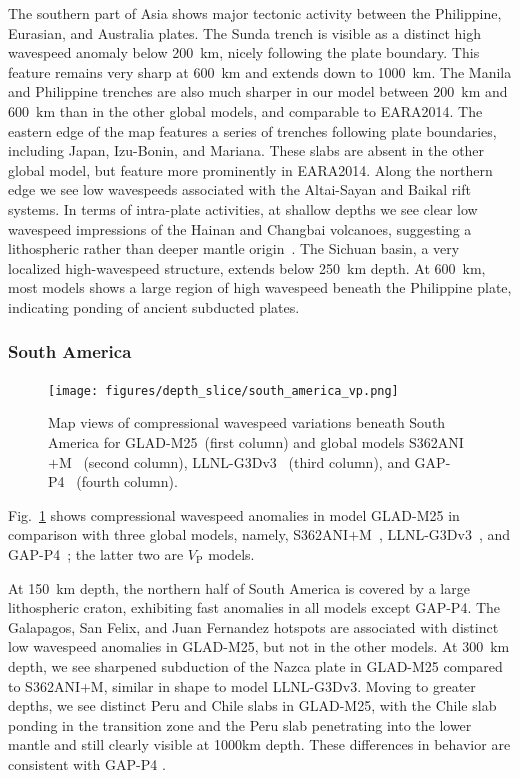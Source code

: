 \documentclass[extra,mreferee]{gji}
\begin{document}
The southern part of Asia shows major tectonic activity between the
Philippine, Eurasian, and Australia plates.
The Sunda trench is visible as a distinct high wavespeed anomaly below 200~km,
nicely following the plate boundary.
This feature remains very sharp at 600~km and extends
down to 1000~km.
The Manila and Philippine trenches are also much sharper in our model between 200~km and
600~km than in the other global models, and comparable to EARA2014.
The eastern edge of the map features a series of trenches following plate boundaries,
including Japan, Izu-Bonin, and Mariana.
These slabs are absent in the other global model,
but feature more prominently in EARA2014.
Along the northern edge we see low wavespeeds associated with the
Altai-Sayan and Baikal rift systems.
In terms of intra-plate activities,
at shallow depths we see clear low wavespeed impressions of the Hainan and Changbai volcanoes,
suggesting a lithospheric rather than deeper mantle origin~\citep{yin2000geologic}.
The Sichuan basin, a very localized high-wavespeed structure, extends below
250~km depth. At 600~km, most models shows a large region of high wavespeed
beneath the Philippine plate, indicating ponding of ancient subducted plates.

\subsubsection{South America}

\begin{figure}[ht!] 
  \texttt{[image: figures/depth\_slice/south\_america\_vp.png]}
  \caption{\small{Map views of compressional wavespeed variations beneath South America for GLAD-M25~(first column) and global models S362ANI$+$M~\citep{moulik2014anisotropic} (second column), LLNL-G3Dv3~\citep{simmons2012llnl} (third column), and GAP-P4~\citep{fukao2013subducted} (fourth column).}}
  \label{fig:southamerica-vp}
  \centering
\end{figure}

Fig.~\ref{fig:southamerica-vp} shows compressional wavespeed anomalies in model GLAD-M25 in comparison with three
global models, namely, S362ANI$+$M~\citep{moulik2014anisotropic}, LLNL-G3Dv3~\citep{simmons2012llnl}, and GAP-P4~\citep{fukao2013subducted};
the latter two are $V_\textrm{P}$ models.

At 150~km depth, the northern half of South America is covered by a large lithospheric craton, exhibiting fast anomalies in all models except GAP-P4.
The Galapagos,
San Felix, and Juan Fernandez hotspots are associated with distinct low wavespeed anomalies in GLAD-M25,
but not in the other models.
At 300~km depth, we see sharpened subduction of the Nazca plate
in GLAD-M25 compared to S362ANI+M, similar in shape to model LLNL-G3Dv3.
Moving to greater depths,
we see distinct Peru and Chile slabs in GLAD-M25,
with the Chile slab ponding in the transition zone
and the Peru slab penetrating into the lower mantle and still clearly visible at 1000km depth.
These differences in behavior are consistent with GAP-P4
\citep{fukao2013subducted}.
\end{document}
